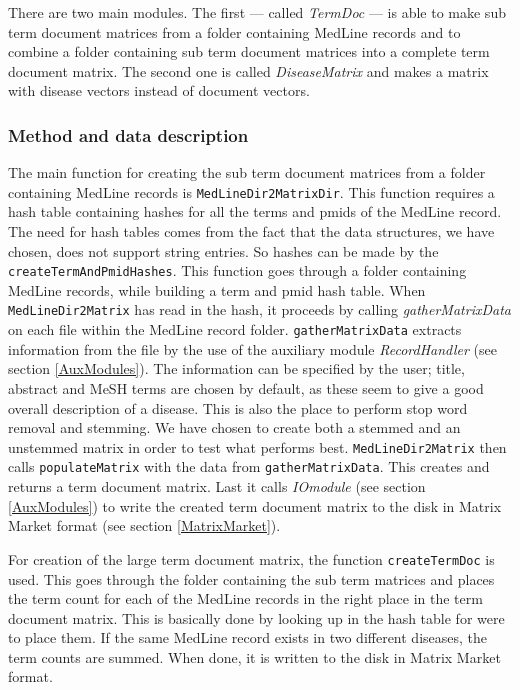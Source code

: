There are two main modules. The first --- called \textit{TermDoc} --- is
able to make sub term document matrices from a folder containing
MedLine records and to combine a folder containing sub term document
matrices into a complete term document matrix. The second one is
called \textit{DiseaseMatrix} and makes a matrix with disease vectors
instead of document vectors.

\subsubsection{Method and data description}
The main function for creating the sub term document matrices from a
folder containing MedLine records is
\texttt{MedLineDir2MatrixDir}. This function requires a hash table
containing hashes for all the terms and pmids of the MedLine
record. The need for hash tables comes from the fact that the data
structures, we have chosen, does not support string entries. So hashes
can be made by the \texttt{createTermAndPmidHashes}. This function
goes through a folder containing MedLine records, while building a
term and pmid hash table. When \texttt{MedLineDir2Matrix} has read in
the hash, it proceeds by calling \textit{gatherMatrixData} on each
file within the MedLine record folder. \texttt{gatherMatrixData}
extracts information from the file by the use of the auxiliary module
\textit{RecordHandler} (see section \ref{AuxModules}). The information
can be specified by the user; title, abstract and MeSH terms are
chosen by default, as these seem to give a good overall description of
a disease. This is also the place to perform stop word removal and
stemming. We have chosen to create both a stemmed and an unstemmed
matrix in order to test what performs best. \texttt{MedLineDir2Matrix} then
calls \texttt{populateMatrix} with the data from
\texttt{gatherMatrixData}. This creates and returns a term document
matrix. Last it calls \textit{IOmodule} (see section \ref{AuxModules}) to write
the created term document matrix to the disk in Matrix Market format
(see section \ref{MatrixMarket}).

For creation of the large term document matrix, the function
\texttt{createTermDoc} is used. This goes through the folder containing
the sub term matrices and places the term count for each of the
MedLine records in the right place in the term document matrix. This
is basically done by looking up in the hash table for were to place
them. If the same MedLine record exists in two different diseases, the
term counts are summed. When done, it is written to the disk in Matrix
Market format.

